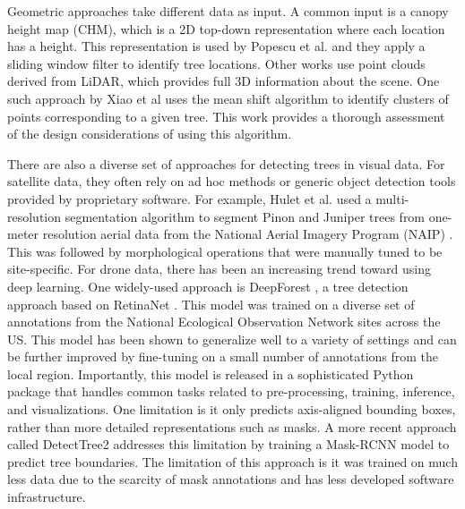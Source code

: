 Geometric approaches take different data as input. A common input is a canopy height map (CHM), which is a 2D top-down representation where each location has a height. This representation is used by Popescu et al. \cite{Popescu2004SeeingHeight} and they apply a sliding window filter to identify tree locations. Other works use point clouds derived from LiDAR, which provides full 3D information about the scene. One such approach by Xiao et al \cite{Xiao2019MeanData} uses the mean shift algorithm to identify clusters of points corresponding to a given tree. This work provides a thorough assessment of the design considerations of using this algorithm.

There are also a diverse set of approaches for detecting trees in visual data. For satellite data, they often rely on ad hoc methods or generic object detection tools provided by proprietary software. 
For example, Hulet et al. \cite{Hulet2014UtilizingWoodlands} used a multi-resolution segmentation algorithm \cite{Baatz2000MultiresolutionS} to segment Pinon and Juniper trees from one-meter resolution aerial data from the National Aerial Imagery Program (NAIP) \cite{U.S.DepartmentofAgriculture2011NationalSheet}. This was followed by morphological operations that were manually tuned to be site-specific.
For drone data, there has been an increasing trend toward using deep learning. One widely-used approach is DeepForest \cite{Weinstein2020DeepForest:Delineation}, a tree detection approach based on RetinaNet \cite{Lin2020FocalDetection}. This model was trained on a diverse set of annotations from the National Ecological Observation Network sites
\cite{Keller2008ANetwork} across the US. This model has been shown to generalize well to a variety of settings and can be further improved by fine-tuning on a small number of annotations from the local region. Importantly, this model is released in a sophisticated Python package that handles common tasks related to pre-processing, training, inference, and visualizations. One limitation is it only predicts axis-aligned bounding boxes, rather than more detailed representations such as masks. A more recent approach called DetectTree2 \cite{DetectTree2} addresses this limitation by training a Mask-RCNN \cite{He2017MaskR-CNN} model to predict tree boundaries. The limitation of this approach is it was trained on much less data due to the scarcity of mask annotations and has less developed software infrastructure.

